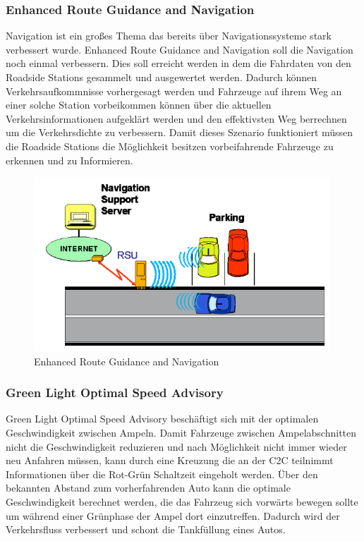 \subsubsection{Enhanced Route Guidance and Navigation}
Navigation ist ein großes Thema das bereits über Navigationssysteme stark verbessert wurde. Enhanced Route Guidance and Navigation soll die Navigation noch einmal verbessern. Dies soll erreicht werden in dem die Fahrdaten von den Roadside Stations gesammelt und ausgewertet werden. Dadurch können Verkehrsaufkommnisse vorhergesagt werden und Fahrzeuge auf ihrem Weg an einer solche Station vorbeikommen können über die aktuellen Verkehrsinformationen aufgeklärt werden und den effektivsten Weg berrechnen um die Verkehrsdichte zu verbessern. Damit dieses Szenario funktioniert müssen die Roadside Stations die Möglichkeit besitzen vorbeifahrende Fahrzeuge zu erkennen und zu Informieren. 
\begin{figure}[htbp]
\includegraphics[width=0.99\textwidth]{content/images/06_use_cases/ergn.png}
\caption{Enhanced Route Guidance and Navigation}
\label{fig:ergn}
\end{figure}

\subsubsection{Green Light Optimal Speed Advisory}
Green Light Optimal Speed Advisory beschäftigt sich mit der optimalen Geschwindigkeit zwischen Ampeln. Damit Fahrzeuge zwischen Ampelabschnitten nicht die Geschwindigkeit reduzieren und nach Möglichkeit nicht immer wieder neu Anfahren müssen, kann durch eine Kreuzung die an der \acl{C2C} teilnimmt Informationen über die Rot-Grün Schaltzeit eingeholt werden. Über den bekannten Abstand zum vorherfahrenden Auto kann die optimale Geschwindigkeit berechnet werden, die das Fahrzeug sich vorwärts bewegen sollte um während einer Grünphase der Ampel dort einzutreffen. Dadurch wird der Verkehrsfluss verbessert und schont die Tankfüllung eines Autos.

